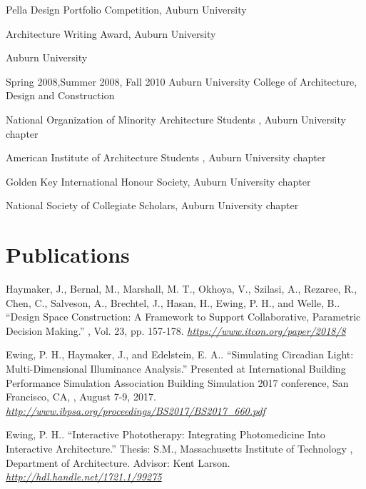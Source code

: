 \documentclass[letterpaper, oneside, 10pt]{article}
\begin{document}
\DotSep{0.25em} Pella Design Portfolio
Competition, Auburn University 

\DotSep{0.25em} Architecture Writing Award, Auburn
University 

\DotSep{0.25em}
Auburn University 

\DotSep{0.25em} Spring 2008,\enspace Summer 2008,\enspace
Fall 2010\DotSep{0.25em} Auburn University College of Architecture, Design and
Construction 

\DotSep{0.25em} National Organization of Minority
Architecture Students , Auburn University chapter

\DotSep{0.25em}
American Institute of Architecture Students , Auburn University
chapter

\DotSep{0.25em} Golden Key International
Honour Society, Auburn University chapter

\DotSep{0.25em} National Society of
Collegiate Scholars, Auburn University chapter



\section*{Publications} %

\hangindent=10pt
Haymaker, J., Bernal, M., Marshall, M. T., Okhoya, V., Szilasi, A., Rezaree,
R., Chen, C., Salveson, A., Brechtel, J., Hasan, H., Ewing, P. H., and Welle,
B.. ``Design Space Construction: A Framework to Support
Collaborative, Parametric Decision Making.'' , Vol. 23, pp. 157-178. 
\textit{\url{https://www.itcon.org/paper/2018/8}}

\hangindent=10pt
Ewing, P. H., Haymaker, J., and Edelstein, E. A.. ``Simulating
Circadian Light: Multi-Dimensional Illuminance Analysis.'' Presented at
International Building Performance Simulation Association  Building
Simulation 2017 conference, San Francisco, CA, , August 7-9, 2017.
 \textit{\url{http://www.ibpsa.org/proceedings/BS2017/BS2017_660.pdf}}

\hangindent=10pt
Ewing, P. H.. ``Interactive Phototherapy: Integrating Photomedicine
Into Interactive Architecture.'' Thesis: S.M., Massachusetts Institute of
Technology , Department of Architecture. Advisor: Kent Larson.
 \textit{\url{http://hdl.handle.net/1721.1/99275}}
\end{document}
